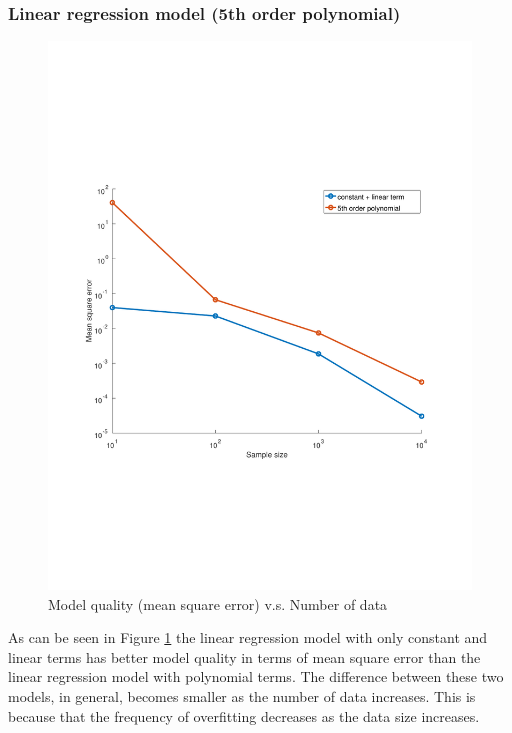 \documentclass[]{article}
\begin{document}
\subsubsection{Linear regression model (5th order polynomial)}
\begin{figure}[H]
	\centering
	\includegraphics[trim= 10cm 5cm 10cm 5cm, scale=0.4]{proj1-3_1b}
	\caption{Model quality (mean square error) v.s. Number of data}
	\label{fig:3b}
\end{figure}

As can be seen in Figure \ref{fig:3b} the linear regression model with only constant and linear terms has better model quality in terms of mean square error than the linear regression model with polynomial terms. The difference between these two models, in general, becomes smaller as the number of data increases. This is because that the frequency of overfitting decreases as the data size increases. 
\end{document}
